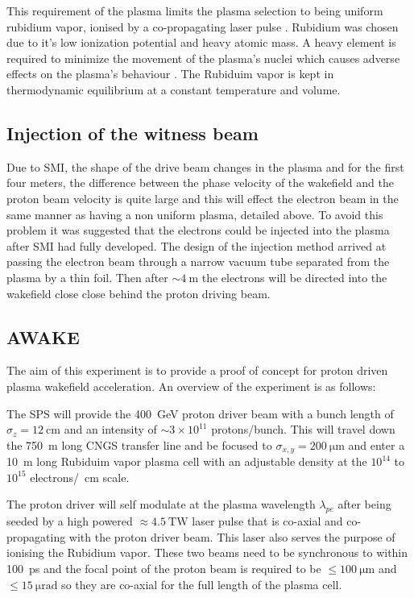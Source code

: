 This requirement of the plasma limits the plasma selection to being uniform
rubidium vapor, ionised by a co-propagating laser pulse \cite{oz2014novel,
oz2014bja}.  Rubidium was chosen due to it's low ionization potential and heavy
atomic mass.  A heavy element is required to minimize the movement of the
plasma's nuclei which causes adverse effects on the plasma's behaviour
\cite{vieira2012nj, vieira2014bqa}. The Rubiduim vapor is kept in thermodynamic
equilibrium at a constant temperature and volume.

\subsection{Injection of the witness beam}

Due to SMI, the shape of the drive beam changes in the plasma and for the first
four meters, the difference between the phase velocity of the wakefield and the
proton beam velocity is quite large and this will effect the electron beam in
the same manner as having a non uniform plasma, detailed above. To avoid this
problem it was suggested that the electrons could be injected into the plasma
after SMI had fully developed. The design of the injection method arrived at
passing the electron beam through a narrow vacuum tube separated from the
plasma by a thin foil. Then after \(\sim \SI{4}{\meter}\) the electrons will be
directed into the wakefield close close behind the proton driving beam.

\subsection{AWAKE}

The aim of this experiment is to provide a proof of concept for proton driven
plasma wakefield acceleration.  An overview of the experiment is as follows:

The SPS will provide the \SI{400}{\giga\electronvolt} proton driver beam with a
bunch length of \(\sigma_z = \SI{12}{\centi\meter}\) and an intensity of \(\sim
3\times 10^{11}\) protons/bunch. This will travel down the \SI{750}{\meter}
long CNGS transfer line and be focused to \(\sigma_{x,y} =
\SI{200}{\micro\meter}\) and enter a \SI{10}{\meter} long Rubiduim vapor plasma
cell with an adjustable density at the \(10^{14}\) to \(10^{15}\)
electrons/\si{\per\centi\meter} scale.

The proton driver will self modulate at the plasma wavelength \(\lambda_{pe}\)
after being seeded by a high powered \(\approx \SI{4.5}{\tera\watt}\) laser
pulse that is co-axial and co-propagating with the proton driver beam. This
laser also serves the purpose of ionising the Rubidium vapor. These two beams
need to be synchronous to within \SI{100}{\pico\second} and the focal point of
the proton beam is required to be \(\le\SI{100}{\micro\meter}\) and
\(\le\SI{15}{\micro\radian}\) so they are co-axial for the full length of the
plasma cell.


